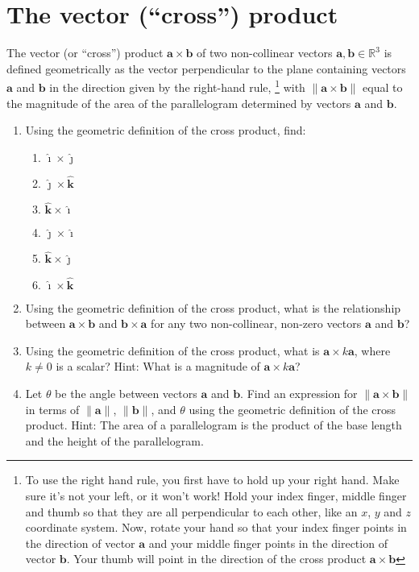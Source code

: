 \documentclass[12pt,letterpaper,fleqn]{article}
\let\oldhat\hat
\renewcommand{\hat}[1]{\oldhat{\boldsymbol{\mathbf{#1}}}}
\renewcommand{\i}{\ensuremath{\hat{\imath}}}
\renewcommand{\j}{\ensuremath{\hat{\jmath}}}
\renewcommand{\k}{\ensuremath{\mathbf{\oldhat{k}}}}
\renewcommand{\vec}[1]{\ensuremath{\pmb{#1}}}
\renewcommand{\v}[1]{\ensuremath{\vec{#1}}}
\begin{document}
\section*{The vector (``cross'') product}
The vector (or ``cross'') product $\v{a}\times\v{b}$ of two non-collinear vectors $\v{a}, \v{b} \in\mathbb{R}^3$ is defined geometrically as the vector perpendicular to the plane containing vectors $\v{a}$ and $\v{b}$ in the direction given by the right-hand rule, \footnote{To use the right hand rule, you first have to hold up your right hand. Make sure it's not your left, or it won't work! Hold your index finger, middle finger and thumb so that they are all perpendicular to each other, like an $x$, $y$ and $z$ coordinate system. Now, rotate your hand so that your index finger points in the direction of vector $\v{a}$ and your middle finger points in the direction of vector $\v{b}$. Your thumb will point in the direction of the cross product $\v{a}\times\v{b}$} with $\|\v{a}\times\v{b}\|$ equal to the magnitude of the area of the parallelogram determined by vectors $\v{a}$ and $\v{b}$.
\begin{enumerate}
  \item Using the geometric definition of the cross product, find:
  \begin{enumerate}
    \item $\i\times\j$
    \item $\j\times\k$
    \item $\k\times\i$
    \item $\j\times\i$
    \item $\k\times\j$
    \item $\i\times\k$
  \end{enumerate}
  \item Using the geometric definition of the cross product, what is the relationship between $\v{a}\times\v{b}$ and $\v{b}\times\v{a}$ for any two non-collinear, non-zero vectors $\v{a}$ and $\v{b}$?
  \item Using the geometric definition of the cross product, what is $\v{a}\times k\v{a}$, where $k\neq 0$ is a scalar? Hint: What is a magnitude of $\v{a}\times k\v{a}$?
  \item Let $\theta$ be the angle between vectors $\v{a}$ and $\v{b}$. Find an expression for $\|\v{a}\times\v{b}\|$ in terms of $\|\v{a}\|$, $\|\v{b}\|$, and $\theta$ using the geometric definition of the cross product. Hint: The area of a parallelogram is the product of the base length and the height of the parallelogram.
\end{enumerate}
\end{document}
